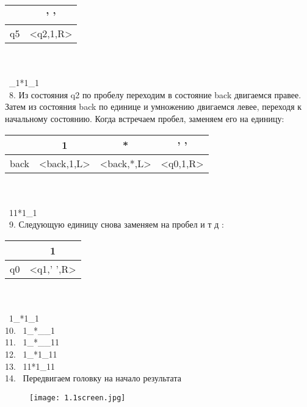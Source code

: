 \documentclass[a4paper]{article}
\begin{document}
\begin{enumerate}
\begin{tabular}{|*{2}{c|}}
\textbf{ }  & ' ' \\
\hline\hline
q5 & <q2,1,R> \\
\end{tabular}
\\ \\
\ \_1*1\_1\\
\ 8. Из состояния q2 по пробелу переходим в состояние back двигаемся правее. Затем из состояния back по единице и умножению двигаемся левее, переходя к начальному состоянию. Когда встречаем пробел, заменяем его на единицу: \\
\begin{tabular}{|*{4}{c|}}
\textbf{ }  & 1 & * & ' ' \\
\hline\hline
back & <back,1,L>& <back,*,L> &<q0,1,R> \\
\end{tabular}
\\ \\
\ 11*1\_1\\

\ 9. Следующую единицу снова заменяем на пробел и т д : \\
\begin{tabular}{|*{2}{c|}}
\textbf{ }  & 1 \\
\hline\hline
q0 & <q1,' ',R> \\
\end{tabular}
\\ \\
\ 1\_*1\_1\\
10. \ 1\_*\_\_1\\
11. \ 1\_*\_\_11\\
12. \ 1\_*1\_11\\
13. \ 11*1\_11\\
14. \ Передвигаем головку на начало результата\\
\begin{figure}[h]
        \centering
        \texttt{[image: 1.1screen.jpg]}
    \end{figure}
\end{enumerate}









\end{document}
